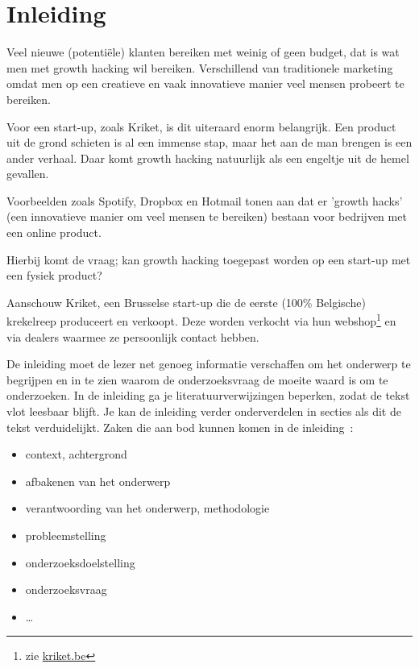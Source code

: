 
\chapter{Inleiding}
\label{ch:inleiding}

Veel nieuwe (potentiële) klanten bereiken met weinig of geen budget, dat is wat men met growth hacking wil bereiken. Verschillend van traditionele marketing omdat men op een creatieve en vaak innovatieve manier veel mensen probeert te bereiken. 

Voor een start-up, zoals Kriket, is dit uiteraard enorm belangrijk. Een product uit de grond schieten is al een immense stap, maar het aan de man brengen is een ander verhaal. Daar komt growth hacking natuurlijk als een engeltje uit de hemel gevallen. 

Voorbeelden zoals Spotify, Dropbox en Hotmail tonen aan dat er 'growth hacks' (een innovatieve manier om veel mensen te bereiken) bestaan voor bedrijven met een online product.

Hierbij komt de vraag; kan growth hacking toegepast worden op een start-up met een fysiek product?

Aanschouw Kriket, een Brusselse start-up die de eerste (100\% Belgische) krekelreep produceert en verkoopt. Deze worden verkocht via hun webshop\footnote{zie \href{https://kriket.be}{kriket.be}} en via dealers waarmee ze persoonlijk contact hebben.



De inleiding moet de lezer net genoeg informatie verschaffen om het onderwerp te begrijpen en in te zien waarom de onderzoeksvraag de moeite waard is om te onderzoeken. In de inleiding ga je literatuurverwijzingen beperken, zodat de tekst vlot leesbaar blijft. Je kan de inleiding verder onderverdelen in secties als dit de tekst verduidelijkt. Zaken die aan bod kunnen komen in de inleiding~\autocite{Pollefliet2011}:

\begin{itemize}
  \item context, achtergrond
  \item afbakenen van het onderwerp
  \item verantwoording van het onderwerp, methodologie
  \item probleemstelling
  \item onderzoeksdoelstelling
  \item onderzoeksvraag
  \item \ldots
\end{itemize}


